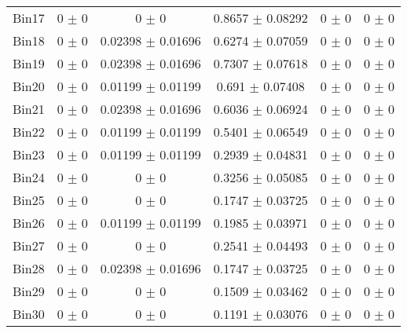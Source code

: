 \begin{tabular}{@{\extracolsep{4pt}}lccccc@{}}
     Bin17 & 0 $\pm$ 0 & 0 $\pm$ 0 & 0.8657 $\pm$ 0.08292 & 0 $\pm$ 0 & 0 $\pm$ 0 \\ 
     Bin18 & 0 $\pm$ 0 & 0.02398 $\pm$ 0.01696 & 0.6274 $\pm$ 0.07059 & 0 $\pm$ 0 & 0 $\pm$ 0 \\ 
     Bin19 & 0 $\pm$ 0 & 0.02398 $\pm$ 0.01696 & 0.7307 $\pm$ 0.07618 & 0 $\pm$ 0 & 0 $\pm$ 0 \\ 
     Bin20 & 0 $\pm$ 0 & 0.01199 $\pm$ 0.01199 & 0.691 $\pm$ 0.07408 & 0 $\pm$ 0 & 0 $\pm$ 0 \\ 
     Bin21 & 0 $\pm$ 0 & 0.02398 $\pm$ 0.01696 & 0.6036 $\pm$ 0.06924 & 0 $\pm$ 0 & 0 $\pm$ 0 \\ 
     Bin22 & 0 $\pm$ 0 & 0.01199 $\pm$ 0.01199 & 0.5401 $\pm$ 0.06549 & 0 $\pm$ 0 & 0 $\pm$ 0 \\ 
     Bin23 & 0 $\pm$ 0 & 0.01199 $\pm$ 0.01199 & 0.2939 $\pm$ 0.04831 & 0 $\pm$ 0 & 0 $\pm$ 0 \\ 
     Bin24 & 0 $\pm$ 0 & 0 $\pm$ 0 & 0.3256 $\pm$ 0.05085 & 0 $\pm$ 0 & 0 $\pm$ 0 \\ 
     Bin25 & 0 $\pm$ 0 & 0 $\pm$ 0 & 0.1747 $\pm$ 0.03725 & 0 $\pm$ 0 & 0 $\pm$ 0 \\ 
     Bin26 & 0 $\pm$ 0 & 0.01199 $\pm$ 0.01199 & 0.1985 $\pm$ 0.03971 & 0 $\pm$ 0 & 0 $\pm$ 0 \\ 
     Bin27 & 0 $\pm$ 0 & 0 $\pm$ 0 & 0.2541 $\pm$ 0.04493 & 0 $\pm$ 0 & 0 $\pm$ 0 \\ 
     Bin28 & 0 $\pm$ 0 & 0.02398 $\pm$ 0.01696 & 0.1747 $\pm$ 0.03725 & 0 $\pm$ 0 & 0 $\pm$ 0 \\ 
     Bin29 & 0 $\pm$ 0 & 0 $\pm$ 0 & 0.1509 $\pm$ 0.03462 & 0 $\pm$ 0 & 0 $\pm$ 0 \\ 
     Bin30 & 0 $\pm$ 0 & 0 $\pm$ 0 & 0.1191 $\pm$ 0.03076 & 0 $\pm$ 0 & 0 $\pm$ 0 \\ 
\hline\hline
  \end{tabular}
